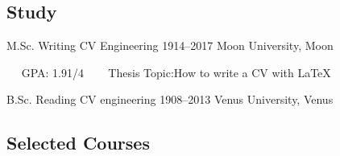 \documentclass[
	a4paper,
]{ThirtyNinesecondscv}
\begin{document}
\makefrontsidebar



\subsection{Study}
\begin{cvtable}[1.5]
	\Educvitem
            {\faGraduationCap}
            {M.Sc. Writing CV Engineering}
            {1914--2017}
            {Moon University, Moon}
    	{ }

            \Shortcustomcvitem
            {~~}
            {GPA:}
            {1.91/4}
            \Shortcustomcvitem
            {~~}
            {~Thesis Topic:}{How to write a CV with \LaTeX}
            
        \Educvitem
            {\faGraduationCap}
            {B.Sc. Reading CV engineering}
            {1908--2013}
            {Venus University, Venus}
            {}
\end{cvtable}


\subsection{Selected Courses}
\end{document}
